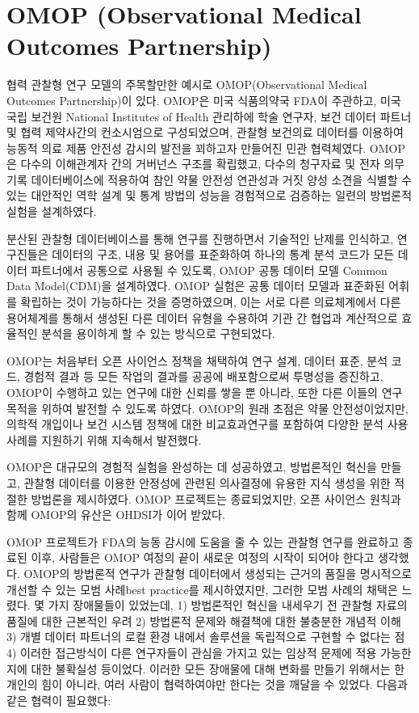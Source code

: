 \documentclass[11pt]{book}
\theoremstyle{definition}
\theoremstyle{definition}
\theoremstyle{definition}
\theoremstyle{remark}
\begin{document}
\section{OMOP (Observational Medical Outcomes
Partnership)}\label{omop-observational-medical-outcomes-partnership}

협력 관찰형 연구 모델의 주목할만한 예시로 OMOP(Observational Medical
Outcomes Partnership)이 있다. OMOP은 미국 식품의약국 FDA이 주관하고,
미국 국립 보건원 National Institutes of Health 관리하에 학술 연구자,
보건 데이터 파트너 및 협력 제약사간의 컨소시엄으로 구성되었으며, 관찰형
보건의료 데이터를 이용하여 능동적 의료 제품 안전성 감시의 발전을
꾀하고자 만들어진 민관 협력체였다. \citep{stang2010omop} OMOP은 다수의
이해관계자 간의 거버넌스 구조를 확립했고, 다수의 청구자료 및 전자 의무
기록 데이터베이스에 적용하여 참인 약물 안전성 연관성과 거짓 양성 소견을
식별할 수 있는 대안적인 역학 설계 및 통계 방법의 성능을 경험적으로
검증하는 일련의 방법론적 실험을 설계하였다.

분산된 관찰형 데이터베이스를 통해 연구를 진행하면서 기술적인 난제를
인식하고, 연구진들은 데이터의 구조, 내용 및 용어를 표준화하여 하나의
통계 분석 코드가 모든 데이터 파트너에서 공통으로 사용될 수 있도록, OMOP
공통 데이터 모델 Common Data Model(CDM)을 설계하였다.
\citep{overhage2012cdm} OMOP 실험은 공통 데이터 모델과 표준화된 어휘를
확립하는 것이 가능하다는 것을 증명하였으며, 이는 서로 다른 의료체계에서
다른 용어체계를 통해서 생성된 다른 데이터 유형을 수용하여 기관 간 협업과
계산적으로 효율적인 분석을 용이하게 할 수 있는 방식으로 구현되었다.

OMOP는 처음부터 오픈 사이언스 정책을 채택하여 연구 설계, 데이터 표준,
분석 코드, 경험적 결과 등 모든 작업의 결과를 공공에 배포함으로써
투명성을 증진하고, OMOP이 수행하고 있는 연구에 대한 신뢰를 쌓을 뿐
아니라, 또한 다른 이들의 연구 목적을 위하여 발전할 수 있도록 하였다.
OMOP의 원래 초점은 약물 안전성이었지만, 의학적 개입이나 보건 시스템
정책에 대한 비교효과연구를 포함하여 다양한 분석 사용사례를 지원하기 위해
지속해서 발전했다.

OMOP은 대규모의 경험적 실험을 완성하는 데 성공하였고,
\citep{ryan2012omop, ryan2013omop} 방법론적인 혁신을 만들고,
\citep{schuemie_2014} 관찰형 데이터를 이용한 안정성에 관련된 의사결정에
유용한 지식 생성을 위한 적절한 방법론을
제시하였다.\citep{madigan_2013, madigan2013design} OMOP 프로젝트는
종료되었지만, 오픈 사이언스 원칙과 함께 OMOP의 유산은 OHDSI가 이어
받았다.

OMOP 프로젝트가 FDA의 능동 감시에 도움을 줄 수 있는 관찰형 연구를
완료하고 종료된 이후, 사람들은 OMOP 여정의 끝이 새로운 여정의 시작이
되어야 한다고 생각했다. OMOP의 방법론적 연구가 관찰형 데이터에서
생성되는 근거의 품질을 명시적으로 개선할 수 있는 모범 사례best
practice를 제시하였지만, 그러한 모범 사례의 채택은 느렸다. 몇 가지
장애물들이 있었는데, 1) 방법론적인 혁신을 내세우기 전 관찰형 자료의
품질에 대한 근본적인 우려 2) 방법론적 문제와 해결책에 대한 불충분한
개념적 이해 3) 개별 데이터 파트너의 로컬 환경 내에서 솔루션을 독립적으로
구현할 수 없다는 점 4) 이러한 접근방식이 다른 연구자들이 관심을 가지고
있는 임상적 문제에 적용 가능한지에 대한 불확실성 등이었다. 이러한 모든
장애물에 대해 변화를 만들기 위해서는 한 개인의 힘이 아니라, 여러 사람이
협력하여야만 한다는 것을 깨달을 수 있었다. 다음과 같은 협력이 필요했다:
\end{document}
